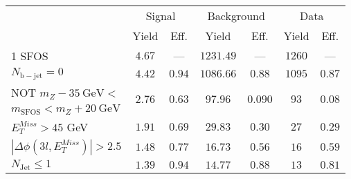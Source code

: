 \begin{tabular}{l||c|c||c|c||c|c}
\hline
 &                 \multicolumn{2}{c||}{Signal}            &  \multicolumn{2}{c||}{Background} &  \multicolumn{2}{c}{Data} \\
   & Yield & Eff. & Yield & Eff. & Yield & Eff.\\
   \hline\hline
   1 SFOS &  $4.67$ &  --- &  $1231.49$ &  --- & $1260$ &  --- \\ 
   \hline
   $N_{\mathrm{b-jet}} = 0$ &  $4.42$ &  $0.94$ &  $1086.66$ &  $0.88$ & $1095$ &  $0.87$\\ 
   \hline
   NOT $m_Z - 35~\mathrm{GeV} <$  &  \multirow{2}{*}{$2.76$} &  \multirow{2}{*}{$0.63$} &  \multirow{2}{*}{$97.96$} &  \multirow{2}{*}{$0.090$} & \multirow{2}{*}{$93$} &  \multirow{2}{*}{$0.08$}\\ 
   $ m_{\mathrm{SFOS}} < m_Z + 20~\mathrm{GeV}$  & & & & &  & \\
   \hline
   $E_{T}^{Miss} > 45$ GeV &  $1.91$ &  $0.69$ &  $29.83$ &  $0.30$ & $27$ &  $0.29$\\ 
   \hline
   $|\Delta\phi(3l,E_{T}^{Miss})| > 2.5$ &  $1.48$ &  $0.77$ &  $16.73$ &  $0.56$ & $16$ &  $0.59$\\ 
   \hline
   $N_{\mathrm{Jet}} \leq 1$ &  $1.39$ &  $0.94$ &  $14.77$ &  $0.88$ & $13$ &  $0.81$\\ 
   \hline
   \end{tabular}
